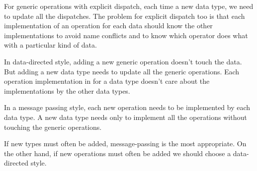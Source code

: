 \documentclass[a4paper,12pt]{article}
\begin{document}
For generic operations with explicit dispatch, each time a new data
type, we need to update all the dispatches.  The problem for explicit
dispatch too is that each implementation of an operation for each data
should know the other implementations to avoid name conflicts and to
know which operator does what with a particular kind of data.

In data-directed style, adding a new generic operation doesn't touch
the data.  But adding a new data type needs to update all the generic
operations.  Each operation implementation in for a data type doesn't
care about the implementations by the other data types.

In a message passing style, each new operation needs to be implemented
by each data type.  A new data type needs only to implement all the
operations without touching the generic operations.

If new types must often be added,  message-passing is the most
appropriate.  On the other hand, if new operations must often be added
we should choose a data-directed style.
\end{document}
